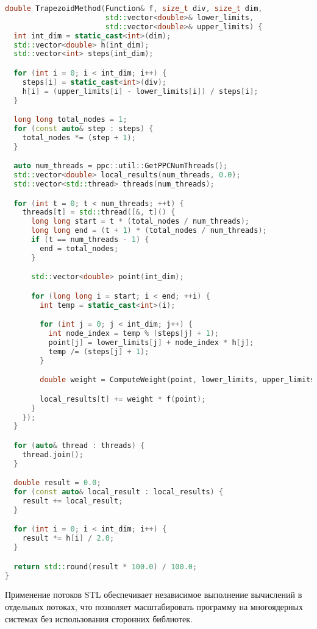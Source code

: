 \documentclass[a4paper,14pt]{article}
\begin{document}
\begin{lstlisting}[language=C++]
double TrapezoidMethod(Function& f, size_t div, size_t dim,
                       std::vector<double>& lower_limits,
                       std::vector<double>& upper_limits) {
  int int_dim = static_cast<int>(dim);
  std::vector<double> h(int_dim);
  std::vector<int> steps(int_dim);

  for (int i = 0; i < int_dim; i++) {
    steps[i] = static_cast<int>(div);
    h[i] = (upper_limits[i] - lower_limits[i]) / steps[i];
  }

  long long total_nodes = 1;
  for (const auto& step : steps) {
    total_nodes *= (step + 1);
  }

  auto num_threads = ppc::util::GetPPCNumThreads();
  std::vector<double> local_results(num_threads, 0.0);
  std::vector<std::thread> threads(num_threads);

  for (int t = 0; t < num_threads; ++t) {
    threads[t] = std::thread([&, t]() {
      long long start = t * (total_nodes / num_threads);
      long long end = (t + 1) * (total_nodes / num_threads);
      if (t == num_threads - 1) {
        end = total_nodes;
      }

      std::vector<double> point(int_dim);

      for (long long i = start; i < end; ++i) {
        int temp = static_cast<int>(i);

        for (int j = 0; j < int_dim; j++) {
          int node_index = temp % (steps[j] + 1);
          point[j] = lower_limits[j] + node_index * h[j];
          temp /= (steps[j] + 1);
        }

        double weight = ComputeWeight(point, lower_limits, upper_limits);

        local_results[t] += weight * f(point);
      }
    });
  }

  for (auto& thread : threads) {
    thread.join();
  }

  double result = 0.0;
  for (const auto& local_result : local_results) {
    result += local_result;
  }

  for (int i = 0; i < int_dim; i++) {
    result *= h[i] / 2.0;
  }

  return std::round(result * 100.0) / 100.0;
}
\end{lstlisting}

Применение потоков STL обеспечивает независимое выполнение вычислений в отдельных потоках, что позволяет масштабировать программу на многоядерных системах без использования сторонних библиотек.
\end{document}

